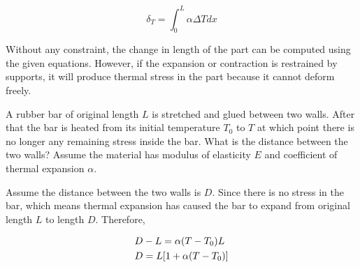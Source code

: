 \documentclass[
10pt,
a4paper,
openany,
svgnames,
]{book}
\begin{document}
\begin{equation}
  \delta _T = \int_0^L \alpha \Delta Tdx
\end{equation}

Without any constraint, the change in length of the part can be computed using the given equations. However, if the expansion or contraction is restrained by supports, it will produce thermal stress in the part because it cannot deform freely.
  
\begin{example}
  
  A rubber bar of original length $L$ is stretched and glued between two walls. After that the bar is heated from its initial temperature $T_0$ to $T$ at which point there is no longer any remaining stress inside the bar. What is the distance between the two walls? Assume the material has modulus of elasticity $E$ and coefficient of thermal expansion $\alpha$.
  
  \begin{figure}[H]
    \centering
  \end{figure}
  
\end{example}
\begin{solution}
  Assume the distance between the two walls is $D$. Since there is no stress in the bar, which means thermal expansion has caused the bar to expand from original length $L$ to length $D$. Therefore,
  
\[\begin{gathered}
  D - L = \alpha (T - T_0)L \hfill \\
  D = L[1 + \alpha (T - T_0)] \hfill \\ 
\end{gathered}\]
	
\end{solution}
\end{document}
